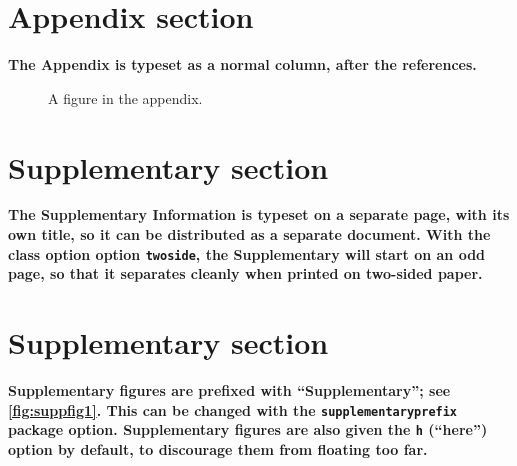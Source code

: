 \documentclass[twocolumn]{article}
\begin{document}

\normalsize



\appendix

\section{Appendix section}

\textbf{The Appendix is typeset as a normal column, after the references.}

\lipsum[2]

\lipsum[3]

\begin{figure}
  \centering
  \fbox{\rule[-.5cm]{4cm}{4cm} \rule[-.5cm]{4cm}{0cm}}
  \caption{A figure in the appendix.}
  \label{fig:appfig1}
\end{figure}

\lipsum[2]


\supplementary

\section{Supplementary section}

\textbf{The Supplementary Information is typeset on a separate page, with its own title, so it can be distributed as a separate document.
With the class option option \texttt{twoside}, the Supplementary will start on an odd page,
so that it separates cleanly when printed on two-sided paper.}

\lipsum[2]

\lipsum[3]

\lipsum[2]

\lipsum[3]

\lipsum[3]

\section{Supplementary section}

\textbf{Supplementary figures are prefixed with ``Supplementary''; see \ref{fig:suppfig1}.
This can be changed with the \texttt{supplementaryprefix} package option.
Supplementary figures are also given the \texttt{h} (``here'') option by default, to discourage them from floating too far.
}
\end{document}
